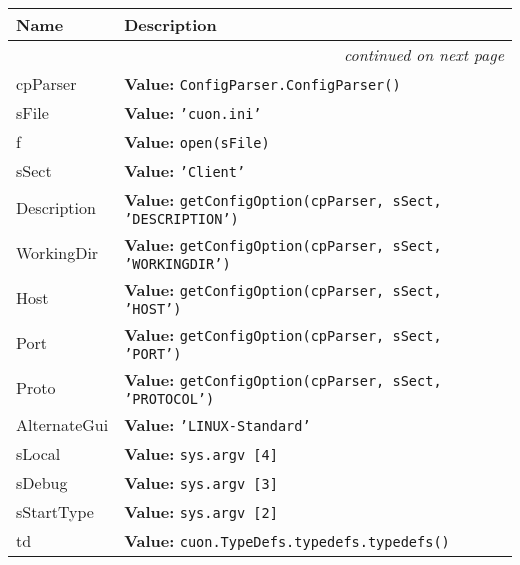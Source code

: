     \vspace{-1cm}
\hspace{\varindent}\begin{longtable}{|p{\varnamewidth}|p{\vardescrwidth}|l}
\cline{1-2}
\cline{1-2} \centering \textbf{Name} & \centering \textbf{Description}& \\
\cline{1-2}
\endhead\cline{1-2}\multicolumn{3}{r}{\small\textit{continued on next page}}\\\endfoot\cline{1-2}
\endlastfoot\raggedright c\-p\-P\-a\-r\-s\-e\-r\- & \raggedright \textbf{Value:} 
{\tt ConfigParser.ConfigParser()}&\\
\cline{1-2}
\raggedright s\-F\-i\-l\-e\- & \raggedright \textbf{Value:} 
{\tt 'cuon.ini'}&\\
\cline{1-2}
\raggedright f\- & \raggedright \textbf{Value:} 
{\tt open(sFile)}&\\
\cline{1-2}
\raggedright s\-S\-e\-c\-t\- & \raggedright \textbf{Value:} 
{\tt 'Client'}&\\
\cline{1-2}
\raggedright D\-e\-s\-c\-r\-i\-p\-t\-i\-o\-n\- & \raggedright \textbf{Value:} 
{\tt getConfigOption(cpParser, sSect, 'DESCRIPTION')}&\\
\cline{1-2}
\raggedright W\-o\-r\-k\-i\-n\-g\-D\-i\-r\- & \raggedright \textbf{Value:} 
{\tt getConfigOption(cpParser, sSect, 'WORKINGDIR')}&\\
\cline{1-2}
\raggedright H\-o\-s\-t\- & \raggedright \textbf{Value:} 
{\tt getConfigOption(cpParser, sSect, 'HOST')}&\\
\cline{1-2}
\raggedright P\-o\-r\-t\- & \raggedright \textbf{Value:} 
{\tt getConfigOption(cpParser, sSect, 'PORT')}&\\
\cline{1-2}
\raggedright P\-r\-o\-t\-o\- & \raggedright \textbf{Value:} 
{\tt getConfigOption(cpParser, sSect, 'PROTOCOL')}&\\
\cline{1-2}
\raggedright A\-l\-t\-e\-r\-n\-a\-t\-e\-G\-u\-i\- & \raggedright \textbf{Value:} 
{\tt 'LINUX-Standard'}&\\
\cline{1-2}
\raggedright s\-L\-o\-c\-a\-l\- & \raggedright \textbf{Value:} 
{\tt sys.argv [4]}&\\
\cline{1-2}
\raggedright s\-D\-e\-b\-u\-g\- & \raggedright \textbf{Value:} 
{\tt sys.argv [3]}&\\
\cline{1-2}
\raggedright s\-S\-t\-a\-r\-t\-T\-y\-p\-e\- & \raggedright \textbf{Value:} 
{\tt sys.argv [2]}&\\
\cline{1-2}
\raggedright t\-d\- & \raggedright \textbf{Value:} 
{\tt cuon.TypeDefs.typedefs.typedefs()}&\\

\end{longtable}
